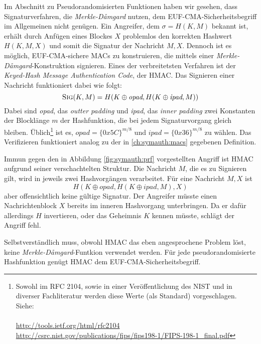 Im Abschnitt zu Pseudorandomisierten Funktionen haben wir gesehen, dass Signaturverfahren, die \emph{Merkle-Dåmgard} nutzen,
dem EUF-CMA-Sicherheitsbegriff im Allgemeinen nicht genügen. Ein Angreifer, dem $\sigma = H(K,M)$ bekannt ist, erhält durch Anfügen eines Blockes $X$ problemlos den korrekten Hashwert $H(K,M,X)$ und somit die Signatur der Nachricht $M,X$.
Dennoch ist es möglich, EUF-CMA-sichere MACs zu konstruieren, die mittels einer \emph{Merkle-Dåmgard}-Konstruktion signieren.
Eines der verbreitetsten Verfahren ist der \textit{Keyed-Hash Message Authentication Code}, der HMAC. Das Signieren einer Nachricht
funktioniert dabei wie folgt:
\begin{equation*}
\textsc{Sig}(K,M) = H(K \oplus \textit{opad}, H(K \oplus \textit{ipad}, M))
\end{equation*}
Dabei sind \textit{opad}, das \textit{outter padding} und \textit{ipad}, das \textit{inner padding} zwei Konstanten der Blocklänge $m$ der Hashfunktion, die bei jedem Signaturvorgang gleich bleiben. Üblich\footnote{Sowohl im RFC 2104, sowie in einer Veröffentlichung des NIST und in diverser Fachliteratur werden diese Werte (als Standard) vorgeschlagen. Siehe: ~\\~\\ \url{http://tools.ietf.org/html/rfc2104} \\ \url{http://csrc.nist.gov/publications/fips/fips198-1/FIPS-198-1_final.pdf}} ist es, $\textit{opad} = \{0x5C\}^{m/8}$ und $\textit{ipad} = \{0x36\}^{m/8}$ zu wählen. Das Verifizieren funktioniert analog zu der in \ref{ch:symauth:macs} gegebenen Definition.

Immun gegen den in Abbildung \ref{fig:symauth:prf} vorgestellten Angriff ist HMAC aufgrund seiner verschachtelten Struktur. Die Nachricht
$M$, die es zu Signieren gilt, wird in jeweils zwei Hashvorgängen verarbeitet. Für eine Nachricht $M,X$ ist 
\begin{equation*}
H(K \oplus \textit{opad}, H(K \oplus \textit{ipad}, M), X)
\end{equation*} 
aber offensichtlich keine gültige Signatur. Der Angreifer müsste einen Nachrichtenblock $X$ bereits im inneren Hashvorgang unterbringen. Da er dafür allerdings $H$ invertieren, oder das Geheimnis $K$ kennen müsste, schlägt der Angriff fehl. 

Selbstverständlich muss, obwohl HMAC das eben angesprochene Problem löst, keine \textit{Merkle-Dåmgard}-Funtkion verwendet werden. Für jede pseudorandomisierte Hashfunktion genügt HMAC dem EUF-CMA-Sicherheitsbegriff.